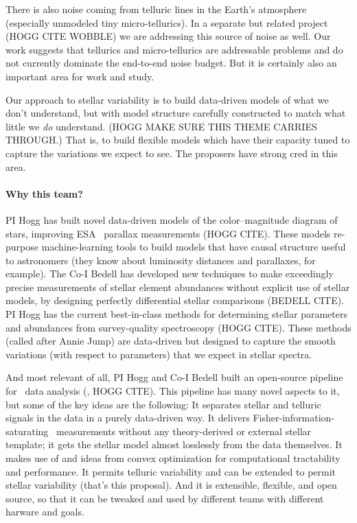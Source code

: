 \documentclass[12pt, letterpaper]{article}
\begin{document}
There is also noise coming from telluric lines in the Earth's atmosphere
(especially unmodeled tiny micro-tellurics).
In a separate but related project (HOGG CITE WOBBLE) we are addressing this
source of noise as well.
Our work suggests that tellurics and micro-tellurics are addressable problems
and do not currently dominate the end-to-end noise budget.
But it is certainly also an important area for work and study.

Our approach to stellar variability is to build data-driven models of what
we don't understand, but with model structure carefully constructed to
match what little we \emph{do} understand. (HOGG MAKE SURE THIS THEME CARRIES THROUGH.)
That is, to build flexible models which have their capacity tuned to
capture the variations we expect to see.
The proposers have strong cred in this area.

\paragraph{Why this team?}
PI Hogg has built novel data-driven models of the color--magnitude diagram of
stars, improving ESA \Gaia\ parallax measurements (HOGG CITE).
These models re-purpose machine-learning tools to build models that
have causal structure useful to astronomers (they know about
luminosity distances and parallaxes, for example).
The Co-I Bedell has developed new techniques to make exceedingly
precise measurements of stellar element abundances without explicit
use of stellar models, by designing perfectly differential stellar
comparisons (BEDELL CITE).
PI Hogg has the current best-in-class methods for determining stellar
parameters and abundances from survey-quality spectroscopy (HOGG
CITE).
These methods (called  after Annie Jump) are
data-driven but designed to capture the smooth variations (with
respect to parameters) that we expect in stellar spectra.

And most relevant of all, PI Hogg and Co-I Bedell built an open-source
pipeline for \EPRV\ data analysis (\wobble, HOGG CITE).
This pipeline has many novel aspects to it, but some of the key ideas
are the following: 
It separates stellar and telluric signals in the data in a purely
data-driven way.
It delivers Fisher-information-saturating \RV\ measurements without any
theory-derived or external stellar template; it gets the stellar model
almost losslessly from the data themselves.
It makes use of  and ideas from convex optimization
for computational tractability and performance.
It permits telluric variability and can be extended to permit stellar
variability (that's this proposal).
And it is extensible, flexible, and open source, so that it can be
tweaked and used by different teams with different harware and goals.
\end{document}
